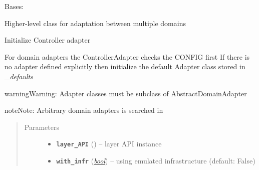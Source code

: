 \documentclass[letterpaper,10pt,english]{sphinxmanual}
\begin{document}
\begin{fulllineitems}
\label{adapt/adaptation:escape.adapt.adaptation.ControllerAdapter}
Bases: \href{https://docs.python.org/2.7/library/functions.html\#object}{}

Higher-level class for {\hyperref[util/nffg:escape.util.nffg.NFFG]{\emph{}}} adaptation
between multiple domains

\begin{fulllineitems}
\label{adapt/adaptation:escape.adapt.adaptation.ControllerAdapter.__init__}
Initialize Controller adapter

For domain adapters the ControllerAdapter checks the CONFIG first
If there is no adapter defined explicitly then initialize the default
Adapter class stored in \emph{\_defaults}

\begin{notice}{warning}{Warning:}
Adapter classes must be subclass of AbstractDomainAdapter
\end{notice}

\begin{notice}{note}{Note:}
Arbitrary domain adapters is searched in
{\hyperref[adapt/domain_adapters:module-escape.adapt.domain_adapters]{\emph{}}}
\end{notice}
\begin{quote}\begin{description}
\item[{Parameters}] \leavevmode\begin{itemize}
\item {} 
\textbf{\texttt{layer\_API}} ({\hyperref[adapt/cas_API:escape.adapt.cas_API.ControllerAdaptationAPI]{\emph{}}}) -- layer API instance

\item {} 
\textbf{\texttt{with\_infr}} (\href{https://docs.python.org/2.7/library/functions.html\#bool}{\emph{bool}}) -- using emulated infrastructure (default: False)

\end{itemize}

\end{description}\end{quote}


\end{fulllineitems}
\end{fulllineitems}
\end{document}
